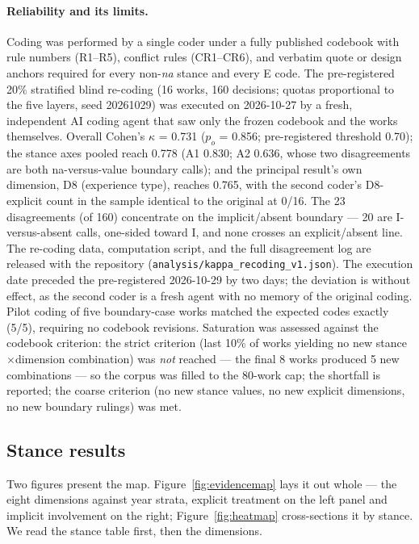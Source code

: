 \documentclass[10pt]{article}
\begin{document}
\paragraph{Reliability and its limits.}
Coding was performed by a single coder under a fully published codebook with rule numbers (R1--R5), conflict rules (CR1--CR6), and verbatim quote or design anchors required for every non-\emph{na} stance and every E code. The pre-registered 20\% stratified blind re-coding (16 works, 160 decisions; quotas proportional to the five layers, seed 20261029) was executed on 2026-10-27 by a fresh, independent AI coding agent that saw only the frozen codebook and the works themselves. Overall Cohen's $\kappa$ = 0.731 ($p_o$ = 0.856; pre-registered threshold 0.70); the stance axes pooled reach 0.778 (A1 0.830; A2 0.636, whose two disagreements are both na-versus-value boundary calls); and the principal result's own dimension, D8 (experience type), reaches 0.765, with the second coder's D8-explicit count in the sample identical to the original at 0/16. The 23 disagreements (of 160) concentrate on the implicit/absent boundary --- 20 are I-versus-absent calls, one-sided toward I, and none crosses an explicit/absent line. The re-coding data, computation script, and the full disagreement log are released with the repository (\texttt{analysis/kappa\_recoding\_v1.json}). The execution date preceded the pre-registered 2026-10-29 by two days; the deviation is without effect, as the second coder is a fresh agent with no memory of the original coding. Pilot coding of five boundary-case works matched the expected codes exactly (5/5), requiring no codebook revisions. Saturation was assessed against the codebook criterion: the strict criterion (last 10\% of works yielding no new stance$\times$dimension combination) was \emph{not} reached --- the final 8 works produced 5 new combinations --- so the corpus was filled to the 80-work cap; the shortfall is reported; the coarse criterion (no new stance values, no new explicit dimensions, no new boundary rulings) was met.

\subsection{Stance results}\label{sec:stance}

Two figures present the map. Figure~\ref{fig:evidencemap} lays it out whole --- the eight dimensions against year strata, explicit treatment on the left panel and implicit involvement on the right; Figure~\ref{fig:heatmap} cross-sections it by stance. We read the stance table first, then the dimensions.
\end{document}
